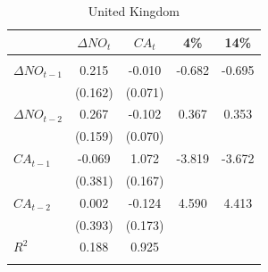 \documentclass[12pt]{article}
\begin{document}
\begin{table}[h!]
\begin{center}
\caption{United Kingdom}			
\begin{threeparttable}

\begin{tabular}{lcccc}
&$ \Delta NO_{t} $        &$ CA_{t} $				 &4\%				&14\% \\
\hline \\[-1.8ex]

$ \Delta NO_{t - 1} $   & 0.215    &-0.010     &-0.682	&	-0.695  \\
				                &(0.162)   &(0.071)    &        &         \\
$ \Delta NO_{t - 2} $   & 0.267    &-0.102     & 0.367  &  0.353  \\
				                &(0.159)   &(0.070)    &        &         \\
$ CA_{t - 1} $          &-0.069    & 1.072     &-3.819  & -3.672  \\
				                &(0.381)   &(0.167)    &        &         \\
$ CA_{t - 2} $          & 0.002    &-0.124     & 4.590  &  4.413  \\
				                &(0.393)   &(0.173)    &        &         \\
$ R^{2} $				        & 0.188    & 0.925     &        &         \\
\hline \\[-1.8ex]


\end{tabular}


\end{threeparttable}
\end{center}
\end{table}
\end{document}
